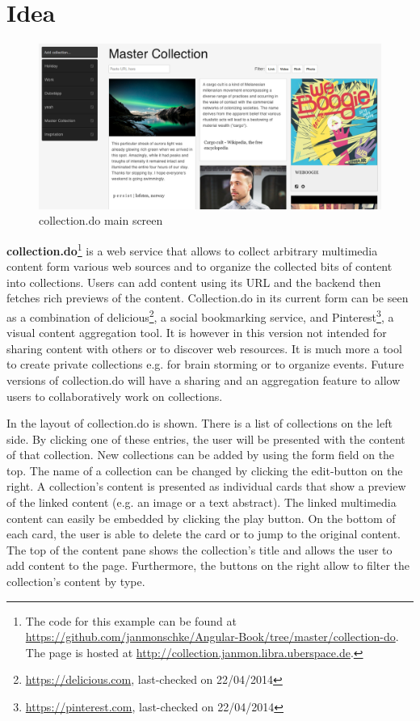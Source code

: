 \section{Idea}

\begin{figure}[h]
  \centerline{
    \includegraphics[width=\linewidth]{images/collection-screen.png}
  }
  \caption[collection.do main screen]{collection.do main screen}
  \label{fig:collection-screen}
\end{figure}

\textbf{collection.do}\footnote{The code for this example can be found at \url{https://github.com/janmonschke/Angular-Book/tree/master/collection-do}. The page is hosted at \url{http://collection.janmon.libra.uberspace.de}.} is a web service that allows to collect arbitrary multimedia content form various web sources and to organize the collected bits of content into collections. Users can add content using its URL and the backend then fetches rich previews of the content. Collection.do in its current form can be seen as a combination of delicious\footnote{\url{https://delicious.com}, last-checked on 22/04/2014}, a social bookmarking service, and Pinterest\footnote{\url{https://pinterest.com}, last-checked on 22/04/2014}, a visual content aggregation tool. It is however in this version not intended for sharing content with others or to discover web resources. It is much more a tool to create private collections e.g. for brain storming or to organize events. Future versions of collection.do will have a sharing and an aggregation feature to allow users to collaboratively work on collections.

In  the layout of collection.do is shown. There is a list of collections on the left side. By clicking one of these entries, the user will be presented with the content of that collection. New collections can be added by using the form field on the top. The name of a collection can be changed by clicking the edit-button on the right. A collection's content is presented as individual cards that show a preview of the linked content (e.g. an image or a text abstract). The linked multimedia content can easily be embedded by clicking the play button. On the bottom of each card, the user is able to delete the card or to jump to the original content. The top of the content pane shows the collection's title and allows the user to add content to the page. Furthermore, the buttons on the right allow to filter the collection's content by type.